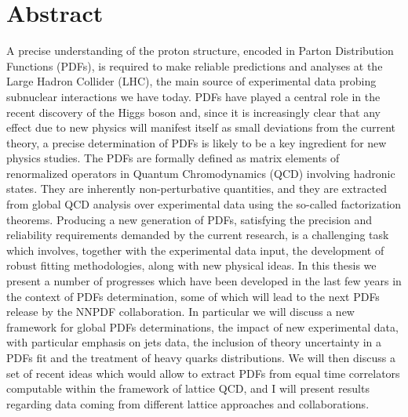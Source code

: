 \chapter*{Abstract}
A precise understanding of the proton structure, encoded in Parton Distribution Functions (PDFs), is required 
to make reliable predictions and analyses at the Large Hadron Collider (LHC), 
the main source of experimental data probing subnuclear interactions we have today.
PDFs have played a central role in the recent 
discovery of the Higgs boson and, since it is increasingly clear that any effect due to new physics 
will manifest itself as small deviations from the current theory, 
a precise determination of PDFs is likely to be a key ingredient 
for new physics studies.
%
The PDFs are formally defined as matrix elements of renormalized operators in Quantum Chromodynamics (QCD) involving hadronic states.
They are inherently non-perturbative quantities, and they are extracted from global QCD analysis over
experimental data using the so-called factorization theorems. 
Producing a new generation of PDFs, satisfying the precision and reliability requirements demanded by the current research,
is a challenging task which involves, together with the experimental data input, the development of robust
fitting methodologies, along with new physical ideas. 
%
In this thesis we present a number of progresses which have been developed in the last few years in the context of 
PDFs determination, some of which will lead to the next PDFs release by the NNPDF collaboration. 
In particular we will discuss a new framework for global PDFs determinations, the impact of new experimental data,
with particular emphasis on jets data, the inclusion of theory uncertainty in a PDFs fit 
and the treatment of heavy quarks distributions.
%
We will then discuss a set of recent ideas which would allow to extract PDFs from equal time correlators computable 
within the framework of lattice QCD, and I will present results regarding data coming from different 
lattice approaches and collaborations.

\blankpage

